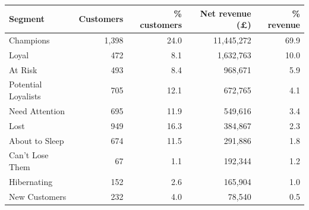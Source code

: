 \begin{tabular}{lrrrr}
\toprule
Segment & Customers & \% customers & Net revenue (\pounds) & \% revenue \\
\midrule
Champions & 1,398 & 24.0 & 11,445,272 & 69.9 \\
Loyal & 472 & 8.1 & 1,632,763 & 10.0 \\
At Risk & 493 & 8.4 & 968,671 & 5.9 \\
Potential Loyalists & 705 & 12.1 & 672,765 & 4.1 \\
Need Attention & 695 & 11.9 & 549,616 & 3.4 \\
Lost & 949 & 16.3 & 384,867 & 2.3 \\
About to Sleep & 674 & 11.5 & 291,886 & 1.8 \\
Can't Lose Them & 67 & 1.1 & 192,344 & 1.2 \\
Hibernating & 152 & 2.6 & 165,904 & 1.0 \\
New Customers & 232 & 4.0 & 78,540 & 0.5 \\
\bottomrule
\end{tabular}
